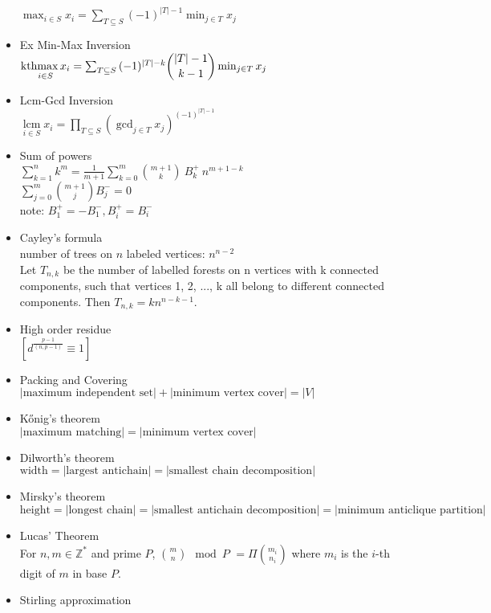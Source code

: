 \begin{itemize}
    $\max_{i\in S}{x_i}=\sum_{T\subseteq S}{(-1)^{|T|-1}\min_{j\in T}{x_j}}$
  \item Ex Min-Max Inversion\\
     $\underset{i\in S}{\operatorname{kthmax}{x_i}}=\sum_{T\subseteq S}{(-1)^{|T|-k}\dbinom {|T|-1}{k-1}\min_{j\in T}{x_j}}$
  \item Lcm-Gcd Inversion\\
     $\underset{i\in S}{\operatorname{lcm}}{x_i}=\prod_{T\subseteq S}{\left(\gcd_{j\in T}{x_j} \right)^{(-1)^{|T|-1}}}$
  \item Sum of powers\\
     $\sum_{k=1}^{n} k^m=\frac{1}{m+1}\sum_{k=0}^{m}{{m+1}\choose{k}}~B^+_k~n^{m+1-k}$\\
     $\sum_{j=0}^{m}{m+1\choose j}B^-_j=0$\\
      note: $B^+_1=-B^-_1, B^+_i=B^-_i$
  \item Cayley's formula \\
    number of trees on $n$ labeled vertices: $n^{n-2}$ \\
    Let $T_{n,k}$ be the number of labelled forests on n vertices with k connected components, such that vertices 1, 2, ..., k all belong to different connected components. Then $T_{n,k} = k n^{n-k-1}.$
  \item High order residue\\
    $[d^{\frac{p-1}{(n,p-1)}}\equiv 1]$
  \item Packing and Covering\\
    $|\mbox{maximum independent set}| + |\mbox{minimum vertex cover}| = |V|$
  \item Kőnig's theorem\\
    $|\mbox{maximum matching}| = |\mbox{minimum vertex cover}|$
  \item Dilworth's theorem\\
    $\mbox{width} = |\mbox{largest antichain}| = |\mbox{smallest chain decomposition}|$
  \item Mirsky's theorem\\
    $\mbox{height} = |\mbox{longest chain}| = |\mbox{smallest antichain decomposition}| = |\mbox{minimum anticlique partition}|$
  \item Lucas’ Theorem\\
    For $n, m \in \mathbb{Z}^{*}$ and prime $P$,
    ${m \choose n} \mod P$
      $= \Pi {m_i \choose n_i}$
    where $m_i$ is the $i$-th digit of $m$ in base $P$.
  \item Stirling approximation\\

\end{itemize}
